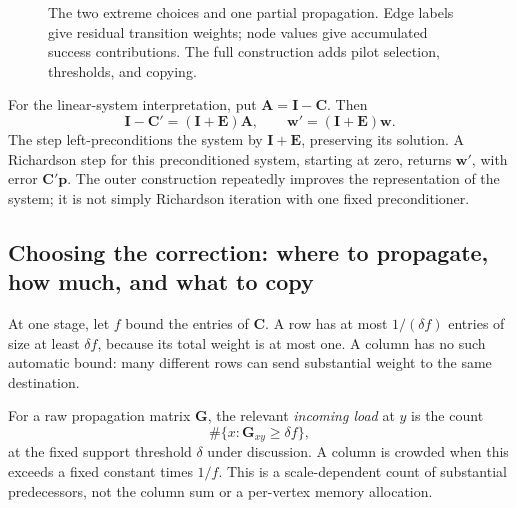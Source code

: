 \documentclass[11pt]{article}
\numberwithin{equation}{section}
\theoremstyle{definition}
\theoremstyle{remark}
\newcommand{\mC}{\mathbf C}
\newcommand{\mE}{\mathbf E}
\newcommand{\vw}{\mathbf w}
\newcommand{\vp}{\mathbf p}
\begin{document}
\begin{figure}[p]
{

}
\caption{The two extreme choices and one partial propagation. Edge labels give residual transition weights; node values give accumulated success contributions. The full construction adds pilot selection, thresholds, and copying.}
\label{fig:three-choices}
\end{figure}

For the linear-system interpretation, put \(\mathbf A=\mathbf I-\mathbf C\). Then
\[
 \mathbf I-\mathbf C'=(\mathbf I+\mathbf E)\mathbf A,\qquad
 \mathbf w'=(\mathbf I+\mathbf E)\mathbf w.
\]
The step left-preconditions the system by \(\mathbf I+\mathbf E\), preserving its solution. A Richardson step for this preconditioned system, starting at zero, returns \(\mathbf w'\), with error \(\mathbf C'\mathbf p\). The outer construction repeatedly improves the representation of the system; it is not simply Richardson iteration with one fixed preconditioner.

\subsection{Choosing the correction: where to propagate, how much, and what to copy}

At one stage, let \(f\) bound the entries of \(\mathbf C\). A row has at most \(1/(\delta f)\) entries of size at least \(\delta f\), because its total weight is at most one. A column has no such automatic bound: many different rows can send substantial weight to the same destination.

For a raw propagation matrix \(\mathbf G\), the relevant \emph{incoming load} at \(y\) is the count
\[
 \#\{x:\mathbf G_{xy}\geq\delta f\},
\]
at the fixed support threshold \(\delta\) under discussion. A column is crowded when this exceeds a fixed constant times \(1/f\). This is a scale-dependent count of substantial predecessors, not the column sum or a per-vertex memory allocation.
\end{document}
